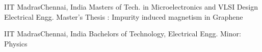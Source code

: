 
{IIT Madras}{Chennai, India}
{\newline Masters of Tech. in Microelectronics and VLSI Design Electrical Engg.}
{\newline Master's Thesis : Impurity induced magnetism in Graphene}
{}

{IIT Madras}{Chennai, India}
{\newline Bachelors of Technology, Electrical Engg.}
{\newline Minor: Physics}
{}